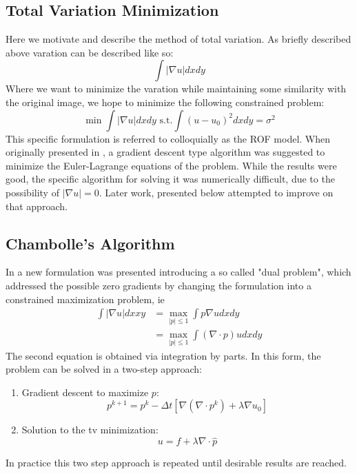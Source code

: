 \documentclass[11pt]{article}
\begin{document}
\subsection{Total Variation Minimization}
Here we motivate and describe the method of total variation.
As briefly described above varation can be described like so:
\begin{equation*}
\int |\nabla u| dx dy
\end{equation*}
Where we want to minimize the varation while maintaining some similarity with the original image, we hope to minimize the following constrained problem:
\begin{equation}
\min \int |\nabla u| dx dy \text{ s.t.} \int (u-u_0)^2 dxdy = \sigma^2
\label{tv:isotropic}
\end{equation}
This specific formulation is referred to colloquially as the ROF model.
When originally presented in \cite{rudin1992nonlinear}, a gradient descent type algorithm was suggested to minimize the Euler-Lagrange equations of the problem.
While the results were good, the specific algorithm for solving it was numerically difficult, due to the possibility of $|\nabla u|=0$.
Later work, presented below attempted to improve on that approach.

\subsection{Chambolle's Algorithm}
In \cite{chambolle2004algorithm} a new formulation was presented introducing a so called "dual problem", which addressed the possible zero gradients by changing the formulation into a constrained maximization problem, ie
\begin{align*}
\int |\nabla u| dx xy &= \max_{|p| \le 1} \int p \nabla u dx dy \\
&= \max_{|p| \le 1} \int (\nabla \cdot p) u dx dy
\end{align*}
The second equation is obtained via integration by parts.  
In this form, the problem can be solved in a two-step approach:
\begin{enumerate}
\item
Gradient descent to maximize $p$:
\begin{equation}
p^{k+1} = p^{k} - \Delta t \left[ \nabla( \nabla \cdot p^{k}) + \lambda \nabla u_0 \right]
\label{ch:dual}
\end{equation}
\item Solution to the tv minimization:
\begin{equation}
u = f + \lambda \nabla \cdot \hat{p}
\label{ch:primal}
\end{equation}
\end{enumerate}
In practice this two step approach is repeated until desirable results are reached.
\end{document}
